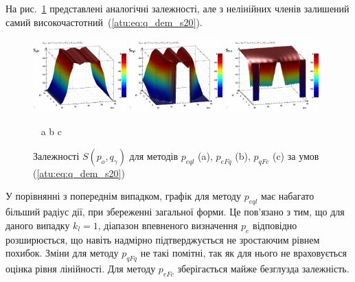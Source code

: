 На рис.~\ref{atu:f:qsl_S_po_qg_s20} представлені аналогічні залежності,
але з нелінійних членів залишений самий високочастотний~(\ref{atu:eq:q_dem_s20}).

\begin{figure}[htb!]
  \begin{center}
    \includegraphics[width=0.32\textwidth]{p/qls_pe-p_po_qg_Sql_s20.png}
    \hfill
    \includegraphics[width=0.32\textwidth]{p/qls_pe-p_po_qg_SFq_s20.png}
    \hfill
    \includegraphics[width=0.32\textwidth]{p/qls_pe-p_po_qg_SFc_s20.png}
  \end{center}
  \vspace{-1.0ex}
  \begin{center}
    ~ \hfill a \hfill\hfill b \hfill\hfill c \hfill ~
  \end{center}
  \vspace{-1.5ex}
  \caption{Залежності $S(p_o,q_\gamma)$ для методів $p_{eql}$ (a), $p_{eFq}$ (b), $p_{qFc}$ (c) за умов (\ref{atu:eq:q_dem_s20})}
  \label{atu:f:qsl_S_po_qg_s20}
\end{figure}

У порівнянні з попереднім випадком, графік для методу
$p_{eql}$ має набагато більший радіус дії, при збереженні загальної
форми. Це пов'язано з тим, що для даного випадку
$k_l = 1$, діапазон впевненого визначення
$p_e$ відповідно розширюється, що навіть надмірно
підтверджується не зростаючим рівнем похибок. Зміни для методу
$p_{qFq}$ не такі помітні, так як для нього не враховується оцінка
рівня лінійності. Для методу
$p_{eFc}$ зберігається майже безглузда залежність.

